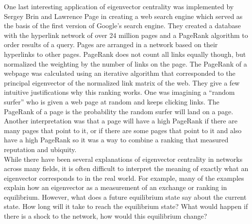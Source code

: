 \documentclass{article}
\theoremstyle{definition}
\theoremstyle{remark}
\begin{document}
One last interesting application of eigenvector centrality was implemented by Sergey Brin and Lawrence Page in creating a web search engine which served as the basis of the first version of Google’s search engine.  They created a database with the hyperlink network of over 24 million pages and a PageRank algorithm to order results of a query.  Pages are arranged in a network based on their hyperlinks to other pages.  PageRank does not count all links equally though, but normalized the weighting by the number of links on the page.  The PageRank of a webpage was calculated using an iterative algorithm that corresponded to the principal eigenvector of the normalized link matrix of the web.  They give a few intuitive justifications why this ranking works.  One was imagining a “random surfer” who is given a web page at random and keeps clicking links.  The PageRank of a page is the probability the random surfer will land on a page.  Another interpretation was that a page will have a high PageRank if there are many pages that point to it, or if there are some pages that point to it and also have a high PageRank so it was a way to combine a ranking that measured reputation and ubiquity.\cite{page1999pagerank}\\

While there have been several explanations of eigenvector centrality in networks across many fields, it is often difficult to interpret the meaning of exactly what an eigenvector corresponds to in the real world.  For example, many of the examples explain how an eigenvector as a measurement of an exchange or ranking in equilibrium.  However, what does a future equilibrium state say about the current state.  How long will it take to reach the equilibrium state?  What would happen if there is a shock to the network, how would this equilibrium change?  \\
\end{document}
